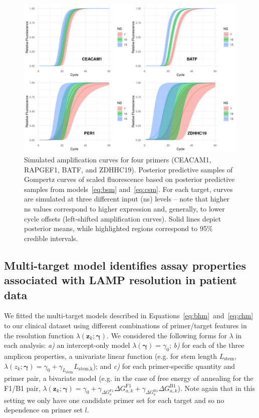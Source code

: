 \documentclass[../thesis.tex]{subfiles}
\begin{document}
\begin{figure}[!tpb] 
\centering
\includegraphics[width=5in]{../figures/chapter2/paper_sm_comp_plot.png}
\caption{Simulated amplification curves for four primers ({CEACAM1}, {RAPGEF1}, {BATF}, and {ZDHHC19}). Posterior predictive samples of Gompertz curves of scaled fluorescence based on posterior predictive samples from models~\ref{eq:bsm} and~\ref{eq:csm}. For each target, curves are simulated at three different  input (\gls{ns}) levels -- note that higher \gls{ns} values correspond to higher expression and, generally, to lower cycle offsets (left-shifted amplification curves). Solid lines depict posterior means, while highlighted regions correspond to 95\% credible intervals. \label{fig:sm_comp_plot}}
\end{figure}


\subsection{Multi-target model identifies assay properties associated with LAMP resolution in patient data\label{sec:hierarchicalresults}}
We fitted the multi-target models described in Equations~\ref{eq:bhm}~and~\ref{eq:chm} to our clinical dataset using different combinations of primer/target features in the resolution function $\lambda(\bm{z}_{k}; \bm{\gamma})$. We considered the following forms for $\lambda$ in each analysis: \emph{a)} an intercept-only model $\lambda(\bm{\gamma}) = \gamma_0$; \emph{b)} for each of the three amplicon properties, a univariate linear function (e.g. for stem length $L_{\text{stem}}$, $\lambda(z_{k}; \bm{\gamma}) = \gamma_0 + \gamma_{L_{\text{stem}}} L_{\text{stem,k}}$); and \emph{c)} for each primer-specific quantity and primer pair, a bivariate model (e.g. in the case of free energy of annealing for the F1/B1 pair, $\lambda(\bm{z}_{k}; \bm{\gamma}) = \gamma_0 + \gamma_{\Delta G_a^{\text{F1}}} \Delta G_{a,k}^{\text{F1}} + \gamma_{\Delta G_a^{\text{B1}}} \Delta G_{a,k}^{\text{B1}}$). Note again that in this setting we only have one candidate primer set for each target and so no dependence on primer set $l$.
\end{document}
